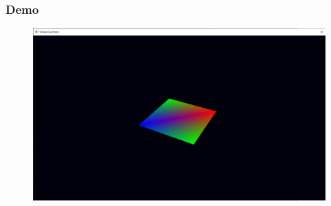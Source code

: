 \begin{frame}
\frametitle{Demo}

\begin{figure}[ht]
    \centering
    \includegraphics[scale=0.25]{images/SlidesUniforms/RenderQuad.png}
\end{figure}

\end{frame}
